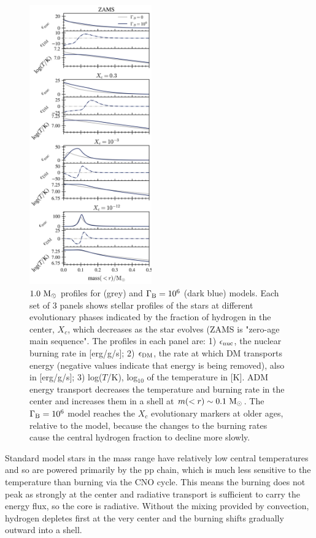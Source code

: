 \documentclass[useAMS,usenatbib]{mnras}
\begin{document}
  \begin{figure}
    \centering
    \includegraphics[width=0.47\textwidth]{plots/m1p0.png}
    \caption{$1.0 \ \mathrm{M}_{\odot}$ profiles for \nodm (grey) and $\Gamma_\mathrm{B} = 10^{6}$ (dark blue) models. Each set of 3 panels shows stellar profiles of the stars at different evolutionary phases indicated by the fraction of hydrogen in the center, $X_c$, which decreases as the star evolves (ZAMS is "zero-age main sequence". The profiles in each panel are: 1) $\epsilon_{\mathrm{nuc}}$, the nuclear burning rate in [erg/g/s]; 2) $\epsilon_{\mathrm{DM}}$, the rate at which DM transports energy (negative values indicate that energy is being removed), also in [erg/g/s]; 3) log($T$/K), log$_{10}$ of the temperature in [K]. ADM energy transport decreases the temperature and burning rate in the center and increases them in a shell at $m(<r) \sim 0.1 \ \mathrm{M}_{\odot}$. The $\Gamma_\mathrm{B} = 10^{6}$ model reaches the $X_c$ evolutionary markers at older ages, relative to the \nodm model, because the changes to the burning rates cause the central hydrogen fraction to decline more slowly.
    }
    \label{fig:m1p0c6}
  \end{figure}


Standard model stars in the mass range \mrangelow have relatively 
low central temperatures and so are powered primarily by the pp chain, 
which is much less sensitive to the temperature than burning via the CNO cycle. 
This means the burning does not peak as strongly at the center and 
radiative transport is sufficient to carry the energy flux, so the core is radiative. 
Without the mixing provided by convection, 
hydrogen depletes first at the very center 
and the burning shifts gradually outward into a shell.
\end{document}
